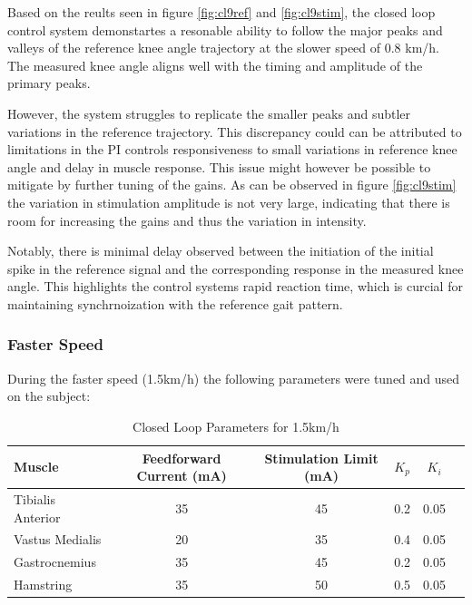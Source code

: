 Based on the reults seen in figure \ref{fig:cl9ref} and \ref{fig:cl9stim}, the closed loop control system demonstartes a resonable ability to follow the major peaks and valleys of the reference knee angle trajectory at the slower speed of 0.8 km/h. The measured knee angle aligns well with the timing and amplitude of the primary peaks. 

However, the system struggles to replicate the smaller peaks and subtler variations in the reference trajectory. This discrepancy could can be attributed to limitations in the PI controls responsiveness to small variations in reference knee angle and delay in muscle response. This issue might however be possible to mitigate by further tuning of the gains. As can be observed in figure \ref{fig:cl9stim} the variation in stimulation amplitude is not very large, indicating that there is room for increasing the gains and thus the variation in intensity.  

Notably, there is minimal delay observed between the initiation of the initial spike in the reference signal and the corresponding response in the measured knee angle. This highlights the control systems rapid reaction time, which is curcial for maintaining synchrnoization with the reference gait pattern.


\subsubsection{Faster Speed}
During the faster speed (1.5km/h) the following parameters were tuned and used on the subject:

\begin{table}[h!]
\centering
\caption{Closed Loop Parameters for 1.5km/h}
\begin{tabular}{|l|c|c|c|c|c|}
\hline
\textbf{Muscle}  & \textbf{Feedforward Current (mA)} & \textbf{Stimulation Limit (mA)} & \textbf{$K_p$} & \textbf{$K_i$} \\ \hline
Tibialis Anterior & 35 & 45 & 0.2 & 0.05 \\ \hline
Vastus Medialis   & 20 & 35 & 0.4 & 0.05 \\ \hline
Gastrocnemius     & 35 & 45 & 0.2 & 0.05 \\ \hline
Hamstring          & 35 & 50 & 0.5 & 0.05 \\ \hline
\end{tabular}
\label{tab:closed_loop_12}
\end{table}

